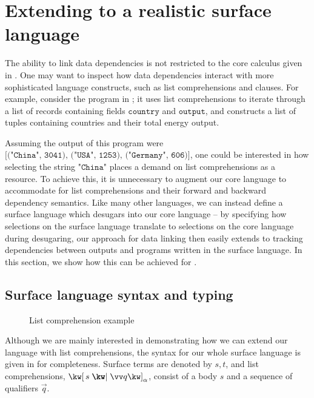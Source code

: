 \section{Extending to a realistic surface language}
\label{sec:surface-language}

The ability to link data dependencies is not restricted to the core calculus given in . One may want to inspect how data dependencies interact with more sophisticated language constructs, such as list comprehensions and clauses. For example, consider the program in ; it uses list comprehensions to iterate through a list of records containing fields $\texttt{country}$ and $\texttt{output}$, and constructs a list of tuples containing countries and their total energy output.

Assuming the output of this program were $\texttt{[("China", 3041), ("USA", 1253), ("Germany", 606)]}$, one could be interested in how selecting the string $\texttt{"China"}$ places a demand on list comprehensions as a resource. To achieve this, it is unnecessary to augment our core language to accommodate for list comprehensions and their forward and backward dependency semantics. Like many other languages, we can instead define a surface language which desugars into our core language -- by specifying how selections on the surface language translate to selections on the core language during desugaring, our approach for data linking then easily extends to tracking dependencies between outputs and programs written in the surface language. In this section, we show how this can be achieved for .

\subsection{Surface language syntax and typing}

\begin{figure}[H]
   \small
   
   \caption{List comprehension example}
   \label{fig:surface-language:example}
\end{figure}

Although we are mainly interested in demonstrating how we can extend our language with list comprehensions, the syntax for our whole surface language is given in  for completeness. Surface terms are denoted by $s, t$, and list comprehensions, $\annListComp{s}{\vec{q}}{\alpha}$, consist of a body $s$ and a sequence of qualifiers $\vec{q}$.

